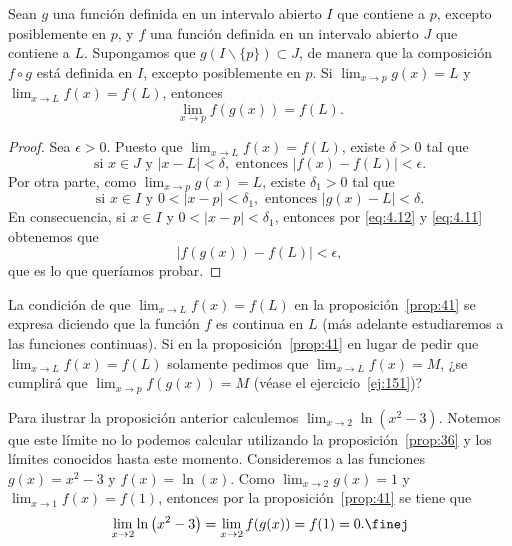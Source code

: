 \documentclass[12pt,a4paper]{book}
\begin{document}
    \begin{proposicion}\label{prop:41}
        Sean $g$ una función
        definida en un intervalo abierto $I$ que contiene a $p$, excepto posiblemente
        en $p$, y $f$ una función definida en un intervalo abierto $J$ que contiene a $L$.
        Supongamos que $g(I\backslash\{p\})\subset J$, de manera que la composición $f\circ g$ está definida
        en $I$, excepto posiblemente en $p$. Si $\lim_{x\to p}g(x)=L$ y $\lim_{x\to L}f(x)=f(L)$,
        entonces
        \begin{equation*}
            \lim_{x\to p}f(g(x))=f(L).
        \end{equation*}
    \end{proposicion}

    \begin{proof}
        Sea $\epsilon>0$. Puesto que $\lim_{x\to L}f(x)=f(L)$, existe $\delta>0$ tal
        que
        \begin{equation}\label{eq:4.11}
            \text{si }x\in J\text{ y }|x-L|<\delta,\text{ entonces }|f(x)-f(L)|<\epsilon.
        \end{equation}
        Por otra parte, como $\lim_{x\to p}g(x)=L$, existe $\delta_{1}>0$ tal que
        \begin{equation}\label{eq:4.12}
            \text{si }x\in I\text{ y }0<|x-p|<\delta_{1},\text{ entonces }|g(x)-L|<\delta.
        \end{equation}
        En consecuencia, si $x\in I$ y $0<|x-p|<\delta_{1}$, entonces por \eqref{eq:4.12} y \eqref{eq:4.11}
        obtenemos que
        \begin{equation*}
            |f(g(x))-f(L)|<\epsilon,
        \end{equation*}
        que es lo que queríamos probar.
    \end{proof}

    La condición de que $\lim_{x\to L}f(x)=f(L)$ en la proposición~\ref{prop:41} se expresa
    diciendo que la función $f$ es continua en $L$ (más adelante estudiaremos a las
    funciones continuas). Si en la proposición~\ref{prop:41} en lugar de pedir que
    $\lim_{x\to L}f(x)=f(L)$ solamente pedimos que $\lim_{x\to L}f(x)=M$, ¿se
    cumplirá que $\lim_{x\to p}f(g(x))=M$ (véase el ejercicio~\ref{ej:151})?

    \begin{ejemplo}\label{ejm:54}
        Para ilustrar la proposición anterior calculemos $\lim_{x\to 2}\ln\left(x^{2}-3\right)$.
        Notemos que este límite no lo podemos calcular utilizando la proposición~\ref{prop:36}
        y los límites conocidos hasta este momento. Consideremos a las funciones
        $g(x)=x^{2}-3$ y $f(x)=\ln(x)$. Como $\lim_{x\to 2}g(x)=1$ y $\lim_{x\to 1}f(x)=f(1)$,
        entonces por la proposición~\ref{prop:41} se tiene que
        \begin{equation*}
            \lim_{x\to 2}\ln\left(x^{2}-3\right)=\lim_{x\to 2}f(g(x))=f(1)=0.\finej
        \end{equation*}
    \end{ejemplo}
\end{document}
